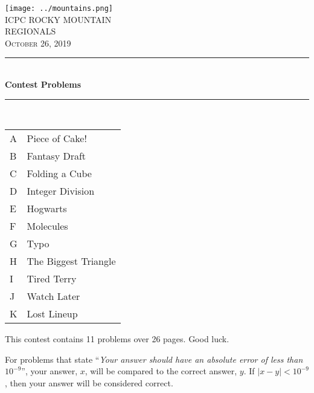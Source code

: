 \documentclass[letterpaper,11pt,noproblemids]{../problemset}
\newcommand{\HRule}{\rule{\linewidth}{0.5mm}}
\begin{document}



\thispagestyle{empty}
\begin{center}
\vspace*{\fill}
\texttt{[image: ../mountains.png]} \\

\textsc{\Huge ICPC ROCKY MOUNTAIN \\[0.3cm] REGIONALS}\\[0.5cm]

\textsc{\Large October 26, 2019}\\[0.3cm]

\HRule \\[0.3cm]

{ \huge \bfseries Contest Problems \\[0.3cm] }

\HRule \\[0.5cm]

{\large
\begin{tabular}{l@{:\hskip4pt}l}
A & Piece of Cake! \\
B & Fantasy Draft \\
C & Folding a Cube \\
D & Integer Division \\
E & Hogwarts \\
F & Molecules \\
G & Typo \\
H & The Biggest Triangle \\
I & Tired Terry \\
J & Watch Later \\
K & Lost Lineup \\
\end{tabular}
}
\vspace*{\fill}
\end{center}

\clearpage

\begin{center}
This contest contains 11 problems over 26 pages. Good luck.
\end{center}

\vskip 20pt

For problems that state ``\textit{Your answer should have an absolute error of less than $10^{-9}$}'', your answer, $x$, will be compared to the correct answer, $y$. If $|x-y| < 10^{-9}$, then your answer will be considered correct.
\end{document}
